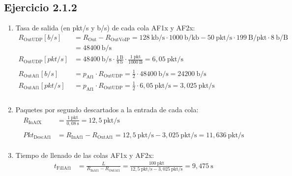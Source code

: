 \subsection{Ejercicio 2.1.2}
\begin{enumerate}
    \item Tasa de salida (en pkt/s y b/s) de cada cola AF1x y AF2x:
    \[
        \label{eq:udp_tasa_salida_con_VoIP}
        \begin{aligned}
            R_{\text{OutUDP}}[b/s] &= R_{\text{Out}} - R_{\text{OutVoIP}} = 128~\text{kb/s} \cdot 1000~\text{b/kb} - 50~\text{pkt/s} \cdot 199~\text{B/pkt} \cdot 8~\text{b/B} \\
                              &= 48400~\text{b/s} \\
            R_{\text{OutUDP}}[pkt/s] &= 48400~\text{b/s} \cdot \frac{1~\text{B}}{8~\text{b}} \cdot \frac{1~\text{pkt}}{1000~\text{B}} = 6,05~\text{pkt/s} \\ \\
            R_{\text{OutAf1}}[b/s] &= p_{\text{Af1}} \cdot R_{\text{OutUDP}} = \frac{1}{2} \cdot 48400~\text{b/s} = 24200~\text{b/s} \\
            R_{\text{OutAf1}}[pkt/s] &= p_{\text{Af1}} \cdot R_{\text{OutUDP}} = \frac{1}{2} \cdot 6,05~\text{pkt/s} = 3,025~\text{pkt/s} \\ \\
        \end{aligned}
    \]
    \item Paquetes por segundo descartados a la entrada de cada cola:
    \[
        \label{eq:udp_paquetes_descartados_con_VoIP}
        \begin{aligned}
            R_{\text{InAfX}} &= \frac{1~\text{pkt}}{0,08~\text{s}} = 12,5~\text{pkt/s} \\ \\
            Pkt_{\text{DescAf1}} &= R_{\text{InAf1}} - R_{\text{OutAf1}} = 12,5~\text{pkt/s} - 3,025~\text{pkt/s} = 11,636~\text{pkt/s} \\
        \end{aligned}
    \]
    \item Tiempo de llenado de las colas AF1x y AF2x:
    \[
        \label{eq:udp_llenado_colas_con_VoIP}
        \begin{aligned}
            t_{\text{FillAf1}} &= \frac{L}{R_{\text{InAf1}} - R_{\text{OutAf1}}} = \frac{100~\text{pkt}}{12,5~\text{pkt/s} - 3,025~\text{pkt/s}} = 9,475~\text{s} \\
        \end{aligned}
    \]

\end{enumerate}

